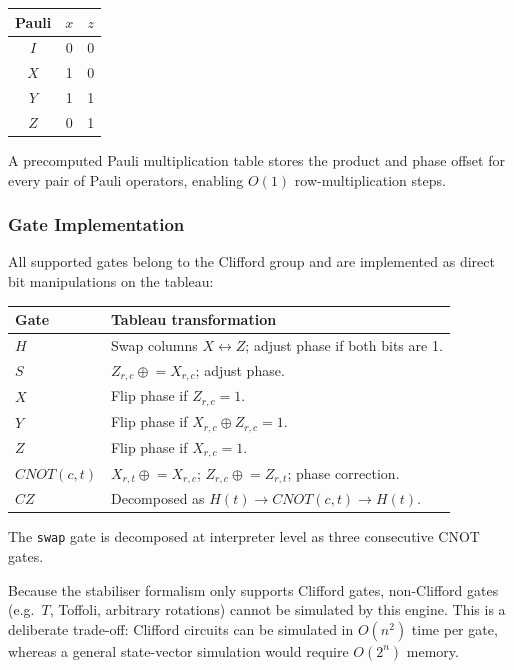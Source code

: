 \begin{center}
\begin{tabular}{|c|c|c|}
\hline
\textbf{Pauli} & $x$ & $z$ \\
\hline
$I$ & 0 & 0 \\
$X$ & 1 & 0 \\
$Y$ & 1 & 1 \\
$Z$ & 0 & 1 \\
\hline
\end{tabular}
\end{center}

A precomputed Pauli multiplication table stores the product and phase offset for
every pair of Pauli operators, enabling $O(1)$ row-multiplication steps.

\subsubsection{Gate Implementation}

All supported gates belong to the Clifford group and are
implemented as direct bit manipulations on the tableau:

\begin{center}
\begin{tabular}{|l|p{9cm}|}
\hline
\textbf{Gate} & \textbf{Tableau transformation} \\
\hline
$H$ & Swap columns $X \leftrightarrow Z$; adjust phase if both bits are 1. \\
$S$ & $Z_{r,c} \mathrel{\oplus}= X_{r,c}$; adjust phase. \\
$X$ & Flip phase if $Z_{r,c} = 1$. \\
$Y$ & Flip phase if $X_{r,c} \oplus Z_{r,c} = 1$. \\
$Z$ & Flip phase if $X_{r,c} = 1$. \\
\hline
$\mathit{CNOT}(c,t)$ & $X_{r,t} \mathrel{\oplus}= X_{r,c}$;\;
                        $Z_{r,c} \mathrel{\oplus}= Z_{r,t}$;\; phase correction. \\
$\mathit{CZ}$ & Decomposed as $H(t) \to \mathit{CNOT}(c,t) \to H(t)$. \\
\hline
\end{tabular}
\end{center}

The \texttt{swap} gate is decomposed at interpreter level as three consecutive CNOT gates.

Because the stabiliser formalism only supports Clifford gates,
non-Clifford gates (e.g.\ $T$, Toffoli, arbitrary rotations)
cannot be simulated by this engine.  This is a deliberate
trade-off: Clifford circuits can be simulated in $O(n^2)$ time per gate,
whereas a general state-vector simulation would require $O(2^n)$ memory.

